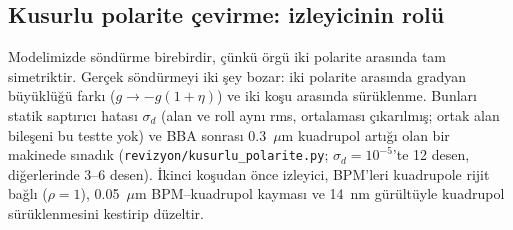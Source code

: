 \documentclass[12pt,a4paper]{extarticle}
\begin{document}
\subsection{Kusurlu polarite çevirme: izleyicinin rolü}
Modelimizde söndürme birebirdir, çünkü örgü iki polarite arasında tam simetriktir. Gerçek söndürmeyi iki şey
bozar: iki polarite arasında gradyan büyüklüğü farkı ($g\to-g(1+\eta)$) ve iki koşu arasında sürüklenme. Bunları
statik saptırıcı hatası $\sigma_d$ (alan ve roll aynı rms, ortalaması çıkarılmış; ortak alan bileşeni bu testte
yok) ve BBA sonrası 0.3~$\mu$m
kuadrupol artığı olan bir makinede sınadık (\texttt{revizyon/kusurlu\_polarite.py}; $\sigma_d=10^{-5}$'te 12
desen, diğerlerinde 3--6 desen). İkinci koşudan önce izleyici, BPM'leri kuadrupole rijit bağlı ($\rho=1$),
0.05~$\mu$m BPM--kuadrupol kayması ve 14~nm gürültüyle kuadrupol sürüklenmesini kestirip düzeltir.
\end{document}
